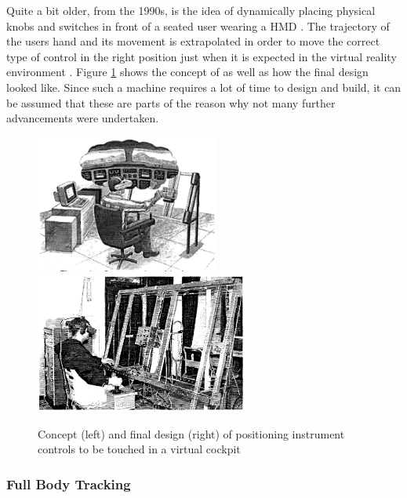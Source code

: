 Quite a bit older, from the 1990s, is the idea of dynamically placing physical knobs and switches in front of a seated user wearing a HMD \citep{Latham1997}. The trajectory of the users hand and its movement is extrapolated in order to move the correct type of control in the right position just when it is expected in the virtual reality environment \citep{Latham1997}. Figure \ref{fig:touchcockpit} shows the concept of \cite{Latham1997} as well as how the final design looked like. Since such a machine requires a lot of time to design and build, it can be assumed that these are parts of the reason why not many further advancements were undertaken.
\begin{figure}[h]
	\begin{center}
		\includegraphics[width=6cm]{03_Figures/05_LitReview/Latham1997_Concept.png}
		\includegraphics[width=7cm]{03_Figures/05_LitReview/Latham1997_FinalDesign.png}
		\caption[Concept and final design of positioning instrument controls to be touched in a virtual cockpit]{Concept (left) and final design (right) of positioning instrument controls to be touched in a virtual cockpit \citep{Latham1997}}
		\label{fig:touchcockpit}
	\end{center}
\end{figure}


\subsubsection{Full Body Tracking}

